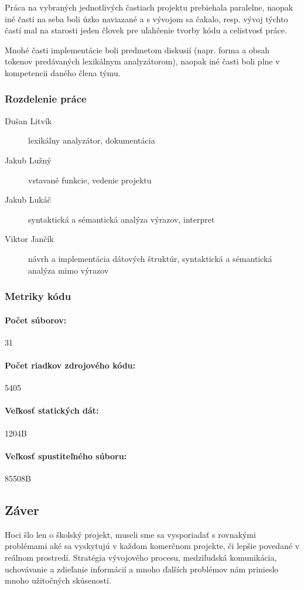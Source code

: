 \documentclass[12pt,a4paper,titlepage,final]{article}
\begin{document}
Práca na vybraných jednotlivých častiach projektu prebiehala paralelne, naopak iné časti na seba boli úzko naviazané a s vývojom sa čakalo, resp. vývoj týchto častí mal na starosti jeden človek pre uľahčenie tvorby kódu a celistvosť práce. 

Mnohé časti implementácie boli predmetom diskusií (napr. forma a obsah tokenov predávaných lexikálnym analyzátorom), naopak iné časti boli plne v kompetencii daného člena týmu. 

\subsubsection{Rozdelenie práce}
\begin{description}
  \item[Dušan Litvík] lexikálny analyzátor, dokumentácia
  \item[Jakub Lužný] vstavané funkcie, vedenie projektu
  \item[Jakub Lukáč] syntaktická a sémantická analýza výrazov, interpret
  \item[Viktor Jančík] návrh a implementácia dátových štruktúr, syntaktická a sémantická analýza mimo výrazov
\end{description}

\subsubsection{Metriky kódu}
\paragraph{Počet súborov:} 31
\paragraph{Počet riadkov zdrojového kódu:} 5405
\paragraph{Veľkosť statických dát:} 1204B
\paragraph{Veľkosť spustiteľného súboru:} 85508B

\subsection{Záver}
Hoci šlo len o školský projekt, museli sme sa vysporiadať s rovnakými problémami aké sa vyskytujú v každom komerčnom projekte, či lepšie povedané v reálnom prostredí. Stratégia vývojového procesu, medziľudská komunikácia, uchovávanie a zdieľanie informácií a mnoho ďalších problémov nám prinieslo mnoho užitočných skúseností. 
\end{document}
